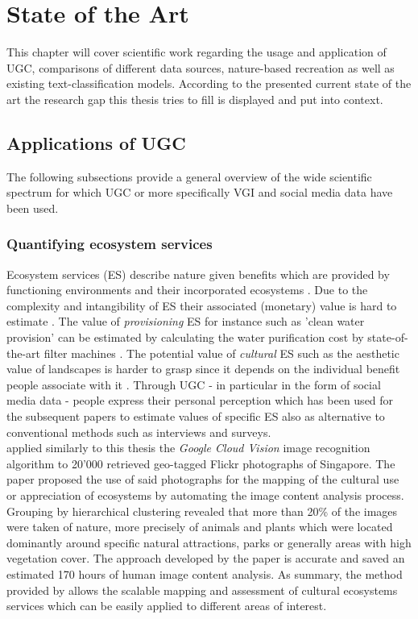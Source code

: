 \chapter{State of the Art} \label{state_of_the_art}
This chapter will cover scientific work regarding the usage and application of UGC, comparisons of different data sources, nature-based recreation as well as existing text-classification models. According to the presented current state of the art the research gap this thesis tries to fill is displayed and put into context.

\section{Applications of UGC} \label{applications_UGC}
The following subsections provide a general overview of the wide scientific spectrum for which UGC or more specifically VGI and social media data have been used.

\subsection{Quantifying ecosystem services}
Ecosystem services (ES) describe nature given benefits which are provided by functioning environments and their incorporated ecosystems \parencite{Jacobs2014}. Due to the complexity and intangibility of ES their associated (monetary) value is hard to estimate \parencite{ACostanza1997}. The value of \textit{provisioning} ES for instance such as 'clean water provision' can be estimated by calculating the water purification cost by state-of-the-art filter machines \parencite{Africa2018}. The potential value of \textit{cultural} ES such as the aesthetic value of landscapes is harder to grasp since it depends on the individual benefit people associate with it \parencite{Hunziker1995}. Through UGC - in particular in the form of social media data - people express their personal perception which has been used for the subsequent papers to estimate values of specific ES also as alternative to conventional methods such as interviews and surveys. \\

\textcite{Richards2018} applied similarly to this thesis the \textit{Google Cloud Vision} image recognition algorithm to 20'000 retrieved geo-tagged Flickr photographs of Singapore. The paper proposed the use of said photographs for the mapping of the cultural use or appreciation of ecosystems by automating the image content analysis process. Grouping by hierarchical clustering revealed that more than 20\% of the images were taken of nature, more precisely of animals and plants which were located dominantly around specific natural attractions, parks or generally areas with high vegetation cover. The approach developed by the paper is accurate and saved an estimated 170 hours of human image content analysis. As summary, the method provided by \textcite{Richards2018} allows the scalable mapping and assessment of cultural ecosystems services which can be easily applied to different areas of interest. \\

